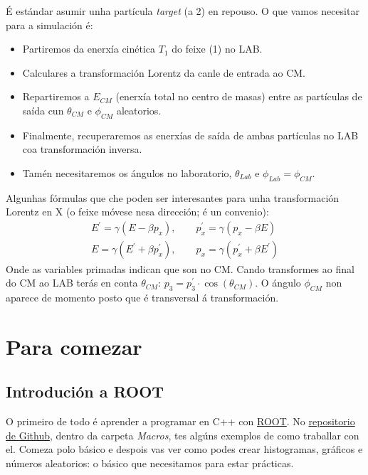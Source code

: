 \documentclass[11pt, a4paper]{article}
\begin{document}
É estándar asumir unha partícula \textit{target} (a 2) en repouso. O que vamos necesitar para a simulación é:
\begin{itemize}
    \item Partiremos da enerxía cinética $T_1$ do feixe (1) no LAB.
    \item Calculares a transformación Lorentz da canle de entrada ao CM.
    \item Repartiremos a $E_{CM}$ (enerxía total no centro de masas) entre as partículas de saída cun $\theta_{CM}$ e $\phi_{CM}$ aleatorios.
    \item Finalmente, recuperaremos as enerxías de saída de ambas partículas no LAB coa transformación inversa.
    \item Tamén necesitaremos os ángulos no laboratorio, $\theta_{Lab}$ e $\phi_{Lab} = \phi_{CM}$.
\end{itemize}

Algunhas fórmulas que che poden ser interesantes para unha transformación Lorentz en X (o feixe móvese nesa dirección; é un convenio):
\begin{gather*}
    E^{\prime} = \gamma \left(E - \beta p_x\right), \qquad p^{\prime}_{x} = \gamma \left(p_x - \beta E\right)\\
    E = \gamma \left(E^{\prime} + \beta p_{x}^{\prime}\right), \qquad p_x = \gamma \left(p^{\prime}_x + \beta E^{\prime}\right)
\end{gather*}
Onde as variables primadas indican que son no CM. Cando transformes ao final do CM ao LAB terás en conta $\theta_{CM}$: $p_3 = p^{\prime}_3 \cdot\cos(\theta_{CM})$. O ángulo $\phi_{CM}$ non aparece de momento posto que é transversal á transformación.

\section{Para comezar}
\subsection{Introdución a ROOT}
O primeiro de todo é aprender a programar en C++ con \href{https://root.cern.ch/}{ROOT}. No \href{https://github.com/Practicas24/Practicas_24}{repositorio de Github}, dentro da carpeta \textit{Macros}, tes algúns exemplos de como traballar con el. Comeza polo básico e despois vas ver como podes crear histogramas, gráficos e números aleatorios: o básico que necesitamos para estar prácticas.
\end{document}
